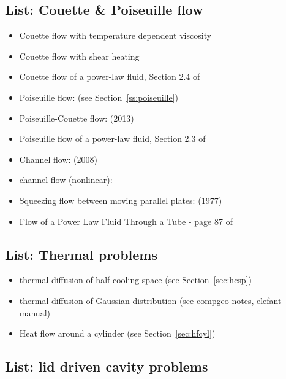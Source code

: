 \subsection{List: Couette \& Poiseuille flow}

\begin{itemize}
\item Couette flow with temperature dependent viscosity \cite{elga10,demh19}
\item Couette flow with shear heating \cite{elga10}
\item Couette flow of a power-law fluid, Section 2.4 of  \textcite{saramito}
\item Poiseuille flow: \cite{fojg94,fuku11,tagm09} (see Section~\ref{ss:poiseuille})
\item Poiseuille-Couette flow: \textcite{fusc13} (2013)
\item Poiseuille flow of a power-law fluid, Section 2.3 of  \textcite{saramito}
\item Channel flow: \textcite{manc08} (2008)
\item channel flow (nonlinear): \cite{geyu03,maie12,frbt19,gery10,elga10}
\item Squeezing flow between moving parallel plates: \textcite{gugu77} (1977)
\item Flow of a Power Law Fluid Through a Tube - page 87 of \textcite{macosko}
\end{itemize}



\subsection{List: Thermal problems}

\begin{itemize}
\item thermal diffusion of half-cooling space (see Section~\ref{sec:hcsp}) 
\item thermal diffusion of Gaussian distribution (see compgeo notes, elefant manual)
\item Heat flow around a cylinder (see Section~\ref{sec:hfcyl})
\end{itemize}

\subsection{List: lid driven cavity problems}

